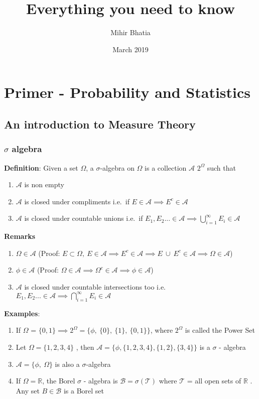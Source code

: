 \documentclass[12pt]{article}
\title{Everything you need to know}
\author{Mihir Bhatia}
\date{March 2019}
\begin{document}
\maketitle
\tableofcontents
\newpage
\section{Primer - Probability and Statistics}

\subsection{An introduction to Measure Theory}
\subsubsection{$\sigma$ algebra}
\textbf{Definition}: Given a set $\Omega$, a $\sigma$-algebra on $\Omega$ is a collection $\mathcal{A}$  \subset \:  $2^{\Omega}$ such that 
\begin{enumerate}
    \item $\mathcal{A}$ is non empty 
    \item $\mathcal{A}$ is closed under compliments i.e.\ if $E \in \mathcal{A} \implies E^{c} \in \mathcal{A}$
    \item $\mathcal{A}$ is closed under countable unions i.e.\ if $E_{1}, E_{2}... \in \mathcal{A} \implies \bigcup\limits_{i=1}^{\infty} E_{i} \in \mathcal{A}$
\end{enumerate}
\textbf{Remarks}
\begin{enumerate}
    \item $\Omega \in \mathcal{A}$ \: (Proof: $E \subset \Omega , \: E \in \mathcal{A} \implies E^{c} \in \mathcal{A} \implies E \: \cup \: E^{c} \in \mathcal{A} \implies \Omega \in \mathcal{A}$)
    \item $\phi \in \mathcal{A}$ \: (Proof: $\Omega \in \mathcal{A} \implies \Omega^{c} \in \mathcal{A} \implies \phi \in \mathcal{A}$)
    \item $\mathcal{A}$ is closed under countable intersections too i.e. $E_{1}, E_{2}... \in \mathcal{A} \implies \bigcap\limits_{i=1}^{\infty} E_{i} \in \mathcal{A}$
\end{enumerate}
\textbf{Examples}:
\begin{enumerate}
    \item If $\Omega$ = $\{0,1\} \implies 2^{\Omega} = \{ \phi,\: \{0\},\: \{1\},\: \{0,1\} \}$, where $2^{\Omega}$ is called the Power Set
    \item Let $\Omega = \{1,2,3,4\}$ , then $\mathcal{A} = \{ \phi, \{1,2,3,4\}, \{1,2\} , \{3,4\}\}$ is a $\sigma$ - algebra 
    \item $\mathcal{A} = \{\phi,\: \Omega\}$ is also a $\sigma$-algebra
    \item If $\Omega = \mathbb{R}$, the Borel $\sigma$ - algebra is $\mathcal{B} = \sigma(\mathcal{T})$ where $\mathcal{T}$ = all open sets of $\mathbb{R}$ . Any set $B \in \mathcal{B}$ is a Borel set
\end{enumerate}
\end{document}

